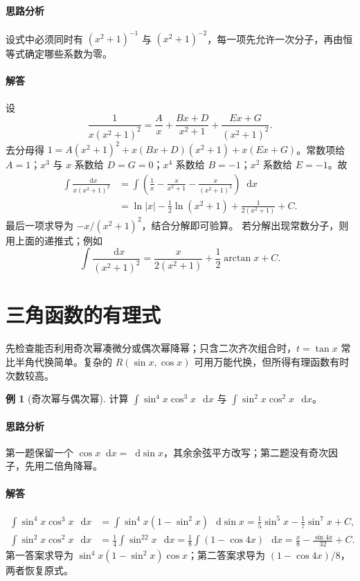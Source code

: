 \documentclass[UTF8,fontset=fandol,12pt,oneside,openany]{ctexrep}
\newcommand{\dd}{\mathop{}\!\mathrm d}
\theoremstyle{definition}
\newtheorem{example}{例}[chapter]
\begin{document}
\paragraph{思路分析}设式中必须同时有 $(x^2+1)^{-1}$ 与 $(x^2+1)^{-2}$，每一项先允许一次分子，再由恒等式确定哪些系数为零。
\paragraph{解答}设
\[
\frac1{x(x^2+1)^2}=\frac A x+\frac{Bx+D}{x^2+1}
+\frac{Ex+G}{(x^2+1)^2}.
\]
去分母得 $1=A(x^2+1)^2+x(Bx+D)(x^2+1)+x(Ex+G)$。常数项给 $A=1$；$x^3$ 与 $x$ 系数给 $D=G=0$；$x^4$ 系数给 $B=-1$；$x^2$ 系数给 $E=-1$。故
\begin{align*}
\int\frac{\dd x}{x(x^2+1)^2}
&=\int\left(\frac1x-\frac{x}{x^2+1}-\frac{x}{(x^2+1)^2}\right)\dd x\\
&=\ln|x|-\frac12\ln(x^2+1)+\frac1{2(x^2+1)}+C.
\end{align*}
最后一项求导为 $-x/(x^2+1)^2$，结合分解即可验算。
若分解出现常数分子，则用上面的递推式；例如
\[
\int\frac{\dd x}{(x^2+1)^2}=\frac{x}{2(x^2+1)}+\frac12\arctan x+C.
\]

\section{三角函数的有理式}
\label{lec:10:trig}
先检查能否利用奇次幂凑微分或偶次幂降幂；只含二次齐次组合时，$t=\tan x$ 常比半角代换简单。复杂的 $R(\sin x,\cos x)$ 可用万能代换，但所得有理函数有时次数较高。

\begin{example}[奇次幂与偶次幂]
计算 $\int\sin^4x\cos^3x\,\dd x$ 与 $\int\sin^2x\cos^2x\,\dd x$。
\end{example}
\paragraph{思路分析}第一题保留一个 $\cos x\dd x=\dd\sin x$，其余余弦平方改写；第二题没有奇次因子，先用二倍角降幂。
\paragraph{解答}
\begin{align*}
\int\sin^4x\cos^3x\,\dd x
&=\int\sin^4x(1-\sin^2x)\,\dd\sin x
=\frac15\sin^5x-\frac17\sin^7x+C,\\
\int\sin^2x\cos^2x\,\dd x
&=\frac14\int\sin^22x\,\dd x
=\frac18\int(1-\cos4x)\,\dd x
=\frac x8-\frac{\sin4x}{32}+C.
\end{align*}
第一答案求导为 $\sin^4x(1-\sin^2x)\cos x$；第二答案求导为 $(1-\cos4x)/8$，两者恢复原式。
\end{document}
